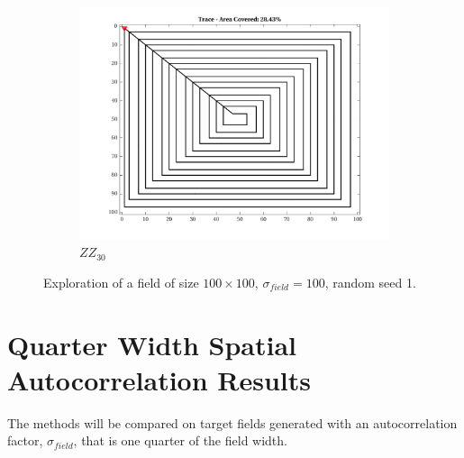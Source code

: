 \begin{figure}[htb!]
    \begin{subfigure}[t]{0.25\textwidth}
        \centering
        \includegraphics[width=\linewidth]{figures/path_zz_30p_100x100_sf_50_seed_1.png}
        \captionsetup{skip=0.20\baselineskip,size=footnotesize}
        \caption{$ZZ_{30}$}
    \end{subfigure}%
    \captionsetup{skip=0.20\baselineskip}
    \caption{Exploration of a field of size $100 \times 100$, $\sigma_{field} = 100$, random seed 1.}
    \label{fig:sf50}
\end{figure}

\clearpage
\section{Quarter Width Spatial Autocorrelation Results}
The methods will be compared on target fields generated with an autocorrelation factor, $\sigma_{field}$, that is one quarter of the field width.

